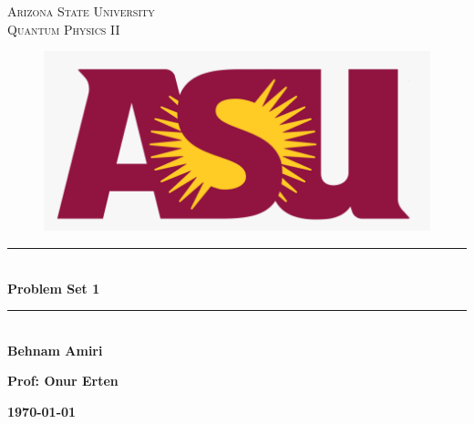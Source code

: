\documentclass[fleqn]{article}
\begin{document}
  \begin{titlepage}

    \newcommand{\HRule}{\rule{\linewidth}{0.5mm}}

    \center


    \textsc{\LARGE Arizona State University}\\[1.5cm]

    \textsc{\LARGE Quantum Physics II}\\[1.5cm]


    \begin{figure}
      \includegraphics[width=\linewidth]{asu.png}
    \end{figure}


    \HRule \\[0.4cm]
    { \huge \bfseries Problem Set 1}\\[0.4cm] 
    \HRule \\[1.5cm]

    \textbf{Behnam Amiri}

    \bigbreak

    \textbf{Prof: Onur Erten}

    \bigbreak


    \textbf{{\large \today}\\[2cm]}

    \vfill

  \end{titlepage}
\end{document}
